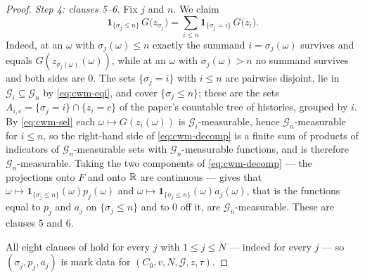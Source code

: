 \begin{proof}
\emph{Step 4: clauses 5--6.}
Fix $j$ and $n$. We claim
\begin{equation}\label{eq:cwm-decomp}
  \mathbf 1_{\{\sigma_j\le n\}}\,G\bigl(z_{\sigma_j}\bigr)
   =\sum_{i\le n}\mathbf 1_{\{\sigma_j=i\}}\,G\bigl(z_i\bigr) .
\end{equation}
Indeed, at an $\omega$ with $\sigma_j(\omega)\le n$ exactly the summand
$i=\sigma_j(\omega)$ survives and equals
$G(z_{\sigma_j(\omega)}(\omega))$, while at an $\omega$ with
$\sigma_j(\omega)>n$ no summand survives and both sides are $0$. The sets
$\{\sigma_j=i\}$ with $i\le n$ are pairwise disjoint, lie in
$\mathcal G_i\subseteq\mathcal G_n$ by \eqref{eq:cwm-eqi}, and cover
$\{\sigma_j\le n\}$; these are the sets $A_{i,c}=\{\sigma_j=i\}\cap\{z_i=c\}$ of
the paper's countable tree of histories, grouped by $i$. By
\eqref{eq:cwm-sel} each $\omega\mapsto G(z_i(\omega))$ is
$\mathcal G_i$-measurable, hence $\mathcal G_n$-measurable for $i\le n$, so the
right-hand side of \eqref{eq:cwm-decomp} is a finite sum of products of
indicators of $\mathcal G_n$-measurable sets with $\mathcal G_n$-measurable
functions, and is therefore $\mathcal G_n$-measurable. Taking the two components
of \eqref{eq:cwm-decomp} --- the projections onto $F$ and onto $\mathbb{R}$ are
continuous --- gives that
$\omega\mapsto\mathbf 1_{\{\sigma_j\le n\}}(\omega)p_j(\omega)$ and
$\omega\mapsto\mathbf 1_{\{\sigma_j\le n\}}(\omega)a_j(\omega)$, that is the
functions equal to $p_j$ and $a_j$ on $\{\sigma_j\le n\}$ and to $0$ off it, are
$\mathcal G_n$-measurable. These are clauses 5 and 6.

All eight clauses of  hold for every $j$ with
$1\le j\le N$ --- indeed for every $j$ --- so $(\sigma_j,p_j,a_j)$ is mark data
for $(C_0,v,N,\mathcal G,z,\tau)$. \end{proof}
